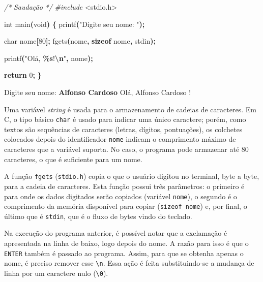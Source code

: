 \documentclass[
  11pt,
  a4paper,
]{scrbook}
\newenvironment{Shaded}{\begin{snugshade}}{\end{snugshade}}
\newcommand{\CommentTok}[1]{\textcolor[rgb]{0.56,0.35,0.01}{\textit{#1}}}
\newcommand{\ControlFlowTok}[1]{\textcolor[rgb]{0.13,0.29,0.53}{\textbf{#1}}}
\newcommand{\DataTypeTok}[1]{\textcolor[rgb]{0.13,0.29,0.53}{#1}}
\newcommand{\DecValTok}[1]{\textcolor[rgb]{0.00,0.00,0.81}{#1}}
\newcommand{\ImportTok}[1]{#1}
\newcommand{\KeywordTok}[1]{\textcolor[rgb]{0.13,0.29,0.53}{\textbf{#1}}}
\newcommand{\NormalTok}[1]{#1}
\newcommand{\OperatorTok}[1]{\textcolor[rgb]{0.81,0.36,0.00}{\textbf{#1}}}
\newcommand{\PreprocessorTok}[1]{\textcolor[rgb]{0.56,0.35,0.01}{\textit{#1}}}
\newcommand{\SpecialCharTok}[1]{\textcolor[rgb]{0.81,0.36,0.00}{\textbf{#1}}}
\newcommand{\StringTok}[1]{\textcolor[rgb]{0.31,0.60,0.02}{#1}}
\begin{document}
\begin{Shaded}
\begin{Highlighting}[]
\CommentTok{/* }
\CommentTok{Saudação}
\CommentTok{*/}
\PreprocessorTok{\#include }\ImportTok{\textless{}stdio.h\textgreater{}}

\DataTypeTok{int}\NormalTok{ main}\OperatorTok{(}\DataTypeTok{void}\OperatorTok{)} \OperatorTok{\{}
\NormalTok{    printf}\OperatorTok{(}\StringTok{"Digite seu nome: "}\OperatorTok{);}

    \DataTypeTok{char}\NormalTok{ nome}\OperatorTok{[}\DecValTok{80}\OperatorTok{];}
\NormalTok{    fgets}\OperatorTok{(}\NormalTok{nome}\OperatorTok{,} \KeywordTok{sizeof}\NormalTok{ nome}\OperatorTok{,}\NormalTok{ stdin}\OperatorTok{);}

\NormalTok{    printf}\OperatorTok{(}\StringTok{"Olá, }\SpecialCharTok{\%s}\StringTok{!}\SpecialCharTok{\textbackslash{}n}\StringTok{"}\OperatorTok{,}\NormalTok{ nome}\OperatorTok{);}

    \ControlFlowTok{return} \DecValTok{0}\OperatorTok{;}
\OperatorTok{\}}
\end{Highlighting}
\end{Shaded}

\begin{Shaded}
\begin{Highlighting}[]
\NormalTok{Digite seu nome: }\KeywordTok{ Alfonso Cardoso }
\NormalTok{Olá, Alfonso Cardoso}
\NormalTok{!}
\end{Highlighting}
\end{Shaded}

Uma variável \emph{string} é usada para o armazenamento de cadeias de
caracteres. Em C, o tipo básico \texttt{char} é usado para indicar uma
único caractere; porém, como textos são sequências de caracteres
(letras, dígitos, pontuações), os colchetes colocados depois do
identificador \texttt{nome} indicam o comprimento máximo de caracteres
que a variável suporta. No caso, o programa pode armazenar até 80
caracteres, o que é suficiente para um nome.

A função \texttt{fgets} (\texttt{stdio.h}) copia o que o usuário digitou
no terminal, byte a byte, para a cadeia de caracteres. Esta função
possui três parâmetros: o primeiro é para onde os dados digitados serão
copiados (variável \texttt{nome}), o segundo é o comprimento da memória
disponível para copiar (\texttt{sizeof\ nome}) e, por final, o último
que é \texttt{stdin}, que é o fluxo de bytes vindo do teclado.

Na execução do programa anterior, é possível notar que a exclamação é
apresentada na linha de baixo, logo depois do nome. A razão para isso é
que o \texttt{ENTER} também é passado ao programa. Assim, para que se
obtenha apenas o nome, é preciso remover esse
\texttt{\textbackslash{}n}. Essa ação é feita substituindo-se a mudança
de linha por um caractere nulo (\texttt{\textbackslash{}0}).
\end{document}
